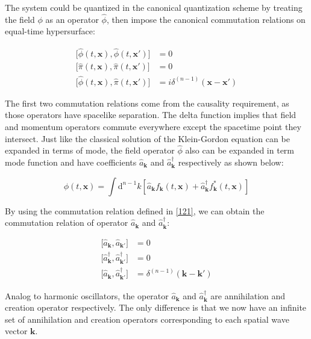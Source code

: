\documentclass[12pt]{article}
\numberwithin{equation}{subsection}
\theoremstyle{mystyle}{\newtheorem{definition}{Definition}[subsection]}
\theoremstyle{mystyle}{\newtheorem{theorem}[definition]{Theorem}}
\theoremstyle{mystyle}{\newtheorem*{remark}{Remark}}
\theoremstyle{mystyle}{\newtheorem{example}{Example}[subsection]}
\theoremstyle{mystyle}{\newtheorem{examples}{Examples}[subsection]}
\theoremstyle{mystyle}{\newtheorem{cthm}{}[subsection]}
\newcommand{\id}{\mathrm{d}}
\begin{document}
The system could be quantized in the canonical quantization scheme by treating the field \(\phi\) as an operator \(\hat{\phi}\),
then impose the canonical commutation relations on equal-time hypersurface:
\begin{definition}\label{121}
  \begin{align*}
    \bigl[\hat{\phi}(t,\mathbf{x}),\hat{\phi}(t,\mathbf{x'})\bigr] & =0                                       \\
    \bigl[\hat{\pi}(t,\mathbf{x}),\hat{\pi}(t,\mathbf{x'})\bigr]   & =0                                       \\
    \bigl[\hat{\phi}(t,\mathbf{x}),\hat{\pi}(t,\mathbf{x'})\bigr]  & =i\delta^{(n-1)}(\mathbf{x}-\mathbf{x'})
  \end{align*}
\end{definition}
The first two commutation relations come from the causality requirement, as those operators have spacelike separation.
The delta function implies that field and momentum operators commute everywhere except the spacetime point they intersect.
Just like the classical solution of the Klein-Gordon equation can be expanded in terms of mode,
the field operator \(\hat{\phi}\) also can be expanded in term mode function and have coefficients \(\hat{a}_{\mathbf{k}}\) and
\(\hat{a}^{\dagger}_{\mathbf{k}}\) respectively as shown below:
\begin{cthm}
  \[\phi(t,\mathbf{x})=\int\id^{n-1}k\left[\hat{a}_{\mathbf{k}}f_{\mathbf{k}}(t,\mathbf{x})+
    \hat{a}^{\dagger}_{\mathbf{k}}f^*_{\mathbf{k}}(t,\mathbf{x})\right]\]
\end{cthm}
By using the commutation relation defined in \ref{121}, we can obtain the commutation relation of operator \(\hat{a}_{\mathbf{k}}\) and
\(\hat{a}^{\dagger}_{\mathbf{k}}\):


\begin{align}
  \bigl[\hat{a}_{\mathbf{k}},\hat{a}_{\mathbf{k'}}\bigr]                     & =0                                      \\
  \bigl[\hat{a}^{\dagger}_{\mathbf{k}},\hat{a}^{\dagger}_{\mathbf{k'}}\bigr] & =0                                      \\
  \bigl[\hat{a}_{\mathbf{k}},\hat{a}^{\dagger}_{\mathbf{k'}}\bigr]           & =\delta^{(n-1)}(\mathbf{k}-\mathbf{k'})
\end{align}


Analog to harmonic oscillators, the operator \(\hat{a}_{\mathbf{k}}\) and
\(\hat{a}^{\dagger}_{\mathbf{k}}\) are annihilation and creation operator respectively.
The only difference is that we now have an infinite set of annihilation and creation operators corresponding to each spatial wave vector \(\mathbf{k}\).
\end{document}
